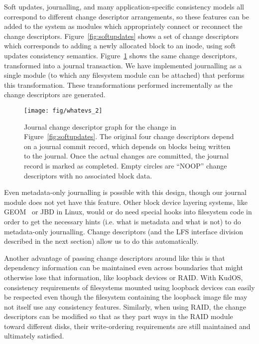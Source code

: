 Soft updates, journalling, and many application-specific consistency models all
correspond to different change descriptor arrangements, so these features can be
added to the system as modules which appropriately connect or reconnect the
change descriptors. Figure~\ref{fig:softupdates} shows a set of change
descriptors which corresponds to adding a newly allocated block to an inode,
using soft updates consistency semantics. Figure~\ref{fig:journal} shows the
same change descriptors, transformed into a journal transaction. We have
implemented journalling as a single module (to which any filesystem module
can be attached) that performs this transformation. These transformations
performed incrementally as the change descriptors are generated.

\begin{figure}
  \centering
  \texttt{[image: fig/whatevs\_2]}%
  \caption{\label{fig:journal} Journal change descriptor graph for the
  change in Figure~\ref{fig:softupdates}.  The original four change
  descriptors depend on a journal commit record, which depends on blocks
  being written to the journal.  Once the actual changes are committed, the
  journal record is marked as completed.  Empty circles are ``NOOP'' change
  descriptors with no associated block data.  }
\end{figure}

Even metadata-only journalling is possible with this design, though our journal
module does not yet have this feature. Other block device layering systems, like
GEOM~\cite{geom} or JBD in Linux, would or do need special hooks into filesystem
code in order to get the necessary hints (i.e. what is metadata and what is not)
to do metadata-only journalling. Change descriptors (and the LFS interface
division described in the next section) allow us to do this automatically.

Another advantage of passing change descriptors around like this is that
dependency information can be maintained even across boundaries that might
otherwise lose that information, like loopback devices or RAID. With KudOS,
consistency requirements of filesystems mounted using loopback devices can
easily be respected even though the filesystem containing the loopback image
file may not itself use any consistency features. Similarly, when using RAID,
the change descriptors can be modified so that as they part ways in the RAID
module toward different disks, their write-ordering requirements are still
maintained and ultimately satisfied.

